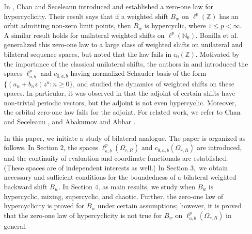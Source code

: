 \documentclass[12pt, reqno]{amsart}
\theoremstyle{definition}
\theoremstyle{remark}
\numberwithin{equation}{section}
\begin{document}
In \cite {Kit1}, Chan and Seceleanu introduced and established a zero-one law for hypercyclicity. Their result says that if a weighted shift $B_w$ on $\ell^p(\mathbb{Z})$ has an orbit admitting non-zero limit points, then $B_w$ is hypercyclic, where $1\leq p<\infty$. A similar result holds for unilateral weighted shifts on $\ell^p(\mathbb{N}_{0})$. Bonilla et al. \cite{Bonilla-Cardeccia} generalized this zero-one law to a large class of weighted shifts on unilateral and bilateral sequence spaces, but noted that the law fails in $c_{0}(\mathbb{Z})$. Motivated by the importance of the classical unilateral shifts, the authors in \cite{Das-Mundayadan} and \cite{Das-Mundayadan1} introduced the spaces $\ell^p_{a,b}$ and $c_{0,a,b}$ having normalized Schauder basis of the form $\{(a_n+b_nz)z^n:n\geq 0\}$, and studied the dynamics of weighted shifts on these spaces. In particular, it was observed in \cite{Das-Mundayadan1} that the adjoint of certain shifts have non-trivial periodic vectors, but the adjoint is not even hypercyclic. Moreover, the orbital zero-one law fails for the adjoint. For related work, we refer to Chan and Seceleanu \cite{Kit}, and Abakumov and Abbar \cite{Abakumov-Abbar}.


In this paper, we initiate a study of bilateral analogue. The paper is organized as follows. In Section $2$, the spaces $\ell^p_{a,b}(\Omega_{r,R})$ and $c_{0,a,b}(\Omega_{r,R})$ are introduced, and the continuity of evaluation and coordinate functionals are established. (These spaces are of independent interests as well.) In Section $3,$ we obtain necessary and sufficient conditions for the boundedness of a bilateral weighted backward shift $B_w$. In Section $4$, as main results, we study when $B_w$ is hypercyclic, mixing, supercyclic, and chaotic. Further, the zero-one law of hypercyclicity is proved for $B_w$ under certain assumptions; however, it is proved that the zero-one law of hypercyclicity is not true for $B_w$ on $\ell^p_{a,b}(\Omega_{r,R})$ in general.
\end{document}
